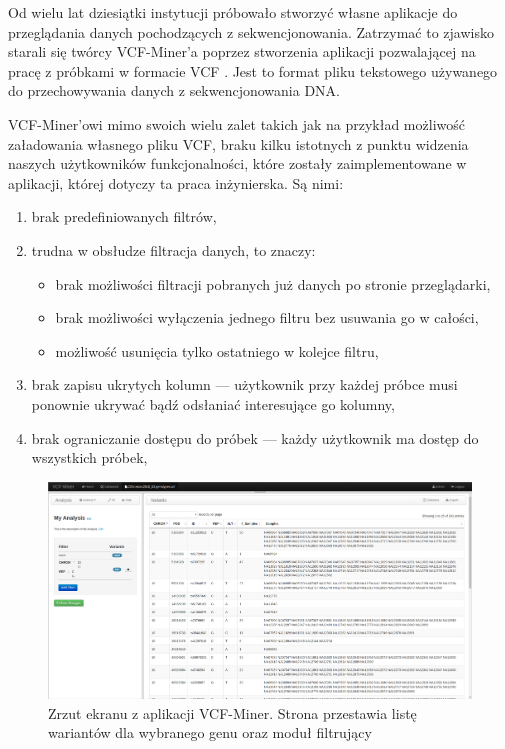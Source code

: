 \documentclass[a4paper,12pt,twoside]{article}
\begin{document}
Od wielu lat dziesiątki instytucji próbowało stworzyć własne aplikacje do przeglądania danych pochodzących z sekwencjonowania. Zatrzymać to zjawisko
starali się twórcy VCF-Miner'a \cite{miner} \cite{minerArt} poprzez
stworzenia aplikacji pozwalającej na pracę z próbkami w formacie VCF \cite{vcfformat}. Jest to format pliku tekstowego używanego do przechowywania
danych z sekwencjonowania DNA.

VCF-Miner'owi mimo swoich wielu zalet takich jak na przykład możliwość
załadowania własnego pliku VCF, braku kilku istotnych z
punktu widzenia naszych użytkowników funkcjonalności, które zostały zaimplementowane w aplikacji, której dotyczy ta praca inżynierska.
Są nimi:
\begin{enumerate}[1)]
\item brak predefiniowanych filtrów,
\item trudna w obsłudze filtracja danych, to znaczy:
\begin{itemize}
\item brak możliwości filtracji pobranych już danych po stronie przeglądarki,
\item brak możliwości wyłączenia jednego filtru bez usuwania go w całości,
\item możliwość usunięcia tylko ostatniego w kolejce filtru,
\end{itemize}
\item brak zapisu ukrytych kolumn — użytkownik przy każdej próbce
musi ponownie ukrywać bądź odsłaniać interesujące go kolumny,
\item brak ograniczanie dostępu do próbek — każdy użytkownik ma dostęp
do wszystkich próbek,
\end{enumerate}
\newpage

\begin{figure}[H]
\includegraphics[width=\linewidth]{obrazy/exac/miner.png}
\caption{Zrzut ekranu z aplikacji VCF-Miner. Strona przestawia listę wariantów dla wybranego genu oraz moduł filtrujący}
\label{fig:minerpic}
\end{figure}
\end{document}
